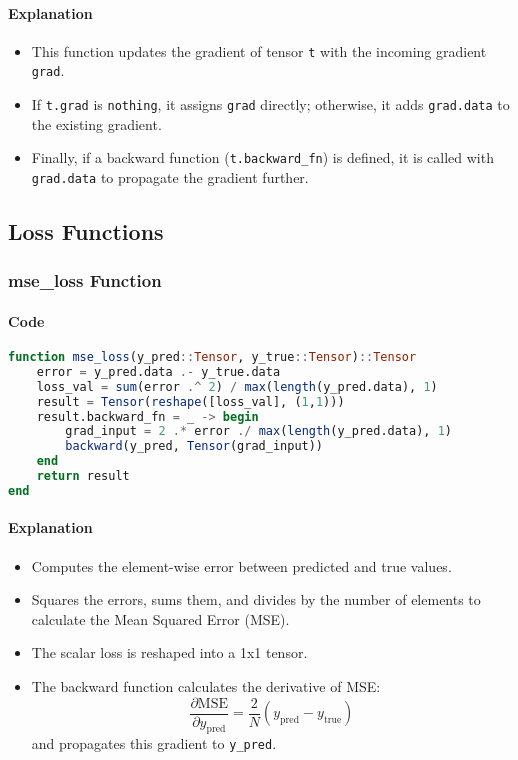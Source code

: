 \documentclass[11pt]{article}
\begin{document}
\paragraph{Explanation}
\begin{itemize}
    \item This function updates the gradient of tensor \texttt{t} with the incoming gradient \texttt{grad}.
    \item If \texttt{t.grad} is \texttt{nothing}, it assigns \texttt{grad} directly; otherwise, it adds \texttt{grad.data} to the existing gradient.
    \item Finally, if a backward function (\texttt{t.backward\_fn}) is defined, it is called with \texttt{grad.data} to propagate the gradient further.
\end{itemize}

\subsection{Loss Functions}
\subsubsection{mse\_loss Function}
\paragraph{Code}
\begin{lstlisting}[language=Julia]
function mse_loss(y_pred::Tensor, y_true::Tensor)::Tensor
    error = y_pred.data .- y_true.data
    loss_val = sum(error .^ 2) / max(length(y_pred.data), 1)
    result = Tensor(reshape([loss_val], (1,1)))
    result.backward_fn = _ -> begin
        grad_input = 2 .* error ./ max(length(y_pred.data), 1)
        backward(y_pred, Tensor(grad_input))
    end
    return result
end
\end{lstlisting}

\paragraph{Explanation}
\begin{itemize}
    \item Computes the element-wise error between predicted and true values.
    \item Squares the errors, sums them, and divides by the number of elements to calculate the Mean Squared Error (MSE).
    \item The scalar loss is reshaped into a 1x1 tensor.
    \item The backward function calculates the derivative of MSE:
    \[
    \frac{\partial \text{MSE}}{\partial y_{\text{pred}}} = \frac{2}{N}(y_{\text{pred}} - y_{\text{true}})
    \]
    and propagates this gradient to \texttt{y\_pred}.
\end{itemize}
\end{document}
